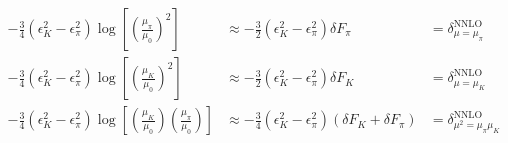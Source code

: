 \documentclass[prd,tightenlines,preprintnumbers,showpacs,superscriptaddress,notitlepage,eqsecnum,floatfix,notitlepage]{revtex4-1}
\begin{document}
\begin{align}
- \frac 34 \left( \epsilon_K^2 -  \epsilon_\pi^2 \right) \log \left[ \left( \frac{\mu_\pi}{\mu_0} \right)^2 \right] &\approx
- \frac 32 \left( \epsilon_K^2 -  \epsilon_\pi^2 \right)  \delta F_\pi \nonumber 
&= \delta^\text{NNLO}_{\mu=\mu_\pi} \, \, \, \, \, \, \, \,
\\
  - \frac 34 \left( \epsilon_K^2 -  \epsilon_\pi^2 \right)  \log \left[ \left( \frac{\mu_K}{\mu_0} \right)^2 \right] &\approx
 - \frac 32 \left( \epsilon_K^2 -  \epsilon_\pi^2 \right) \delta F_K \nonumber 
 &= \delta^\text{NNLO}_{\mu=\mu_K} \, \, \, \, \, \, \, \,
 \\
    - \frac 34 \left( \epsilon_K^2 -  \epsilon_\pi^2 \right) \log \left[ \left( \frac{\mu_K}{\mu_0} \right) \left( \frac{\mu_\pi}{\mu_0} \right)\right] &\approx
  - \frac 34 \left( \epsilon_K^2 -  \epsilon_\pi^2 \right) \left( \delta F_K  + \delta F_\pi  \right) 
  &= \delta^\text{NNLO}_{\mu^2=\mu_\pi \mu_K}
\end{align} 
\end{document}
